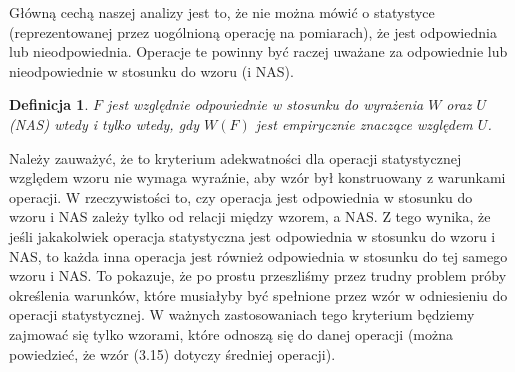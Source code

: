 \documentclass[12pt,a4paper]{report}
\newtheorem{definition}{Definicja}[chapter]
\begin{document}
Główną cechą naszej analizy jest to, że nie można mówić o statystyce (reprezentowanej przez uogólnioną operację na pomiarach), że jest odpowiednia lub nieodpowiednia. Operacje te powinny być raczej uważane za odpowiednie lub nieodpowiednie w stosunku do wzoru (i NAS).
\begin{definition}
$F$ jest względnie odpowiednie w stosunku do wyrażenia $W$ oraz $U$ (NAS) wtedy i tylko wtedy, gdy $W(F)$ jest empirycznie znaczące względem $U$.
\end{definition}

Należy zauważyć, że to kryterium adekwatności dla operacji statystycznej względem wzoru nie wymaga wyraźnie, aby wzór był konstruowany z warunkami operacji. W rzeczywistości to, czy operacja jest odpowiednia w stosunku do wzoru i NAS zależy tylko od relacji między wzorem, a NAS. Z tego wynika, że jeśli jakakolwiek operacja statystyczna jest odpowiednia w stosunku do wzoru i NAS, to każda inna operacja jest również odpowiednia w stosunku do tej samego wzoru i NAS. To pokazuje, że po prostu przeszliśmy przez trudny problem próby określenia warunków, które musiałyby być spełnione przez wzór w odniesieniu do operacji statystycznej. W ważnych zastosowaniach tego kryterium będziemy zajmować się tylko wzorami, które odnoszą się do danej operacji (można powiedzieć, że wzór (3.15) dotyczy średniej operacji).
\end{document}
